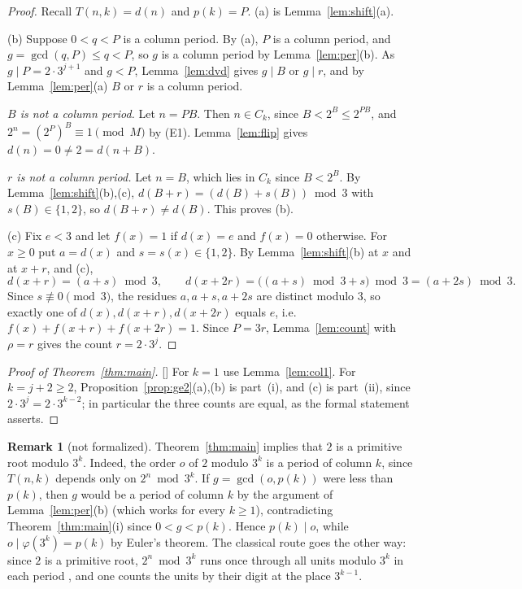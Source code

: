 \documentclass[11pt]{amsart}
\theoremstyle{plain}
\theoremstyle{definition}
\newtheorem{remark}[theorem]{Remark}
\begin{document}
\begin{proof}
Recall $T(n,k)=d(n)$ and $p(k)=P$.
(a) is Lemma~\ref{lem:shift}(a).

(b) Suppose $0<q<P$ is a column period. By (a), $P$ is a column period, and $g=\gcd(q,P)\le q<P$, so $g$ is a column period by Lemma~\ref{lem:per}(b). As $g\mid P=2\cdot3^{j+1}$ and $g<P$, Lemma~\ref{lem:dvd} gives $g\mid B$ or $g\mid r$, and by Lemma~\ref{lem:per}(a) $B$ or $r$ is a column period.

\emph{$B$ is not a column period.} Let $n=PB$. Then $n\in C_k$, since $B<2^B\le2^{PB}$, and $2^{n}=(2^{P})^{B}\equiv1\pmod M$ by (E1). Lemma~\ref{lem:flip} gives $d(n)=0\ne2=d(n+B)$.

\emph{$r$ is not a column period.} Let $n=B$, which lies in $C_k$ since $B<2^B$. By Lemma~\ref{lem:shift}(b),(c), $d(B+r)=(d(B)+s(B))\bmod3$ with $s(B)\in\{1,2\}$, so $d(B+r)\ne d(B)$. This proves (b).

(c) Fix $e<3$ and let $f(x)=1$ if $d(x)=e$ and $f(x)=0$ otherwise. For $x\ge0$ put $a=d(x)$ and $s=s(x)\in\{1,2\}$. By Lemma~\ref{lem:shift}(b) at $x$ and at $x+r$, and (c),
\[
  d(x+r)=(a+s)\bmod3,\qquad d(x+2r)=\bigl((a+s)\bmod3+s\bigr)\bmod3=(a+2s)\bmod 3 .
\]
Since $s\not\equiv0\pmod3$, the residues $a,a+s,a+2s$ are distinct modulo $3$, so exactly one of $d(x),d(x+r),d(x+2r)$ equals $e$, i.e.\ $f(x)+f(x+r)+f(x+2r)=1$. Since $P=3r$, Lemma~\ref{lem:count} with $\rho=r$ gives the count $r=2\cdot3^j$.
\end{proof}

\begin{proof}[Proof of Theorem~\ref{thm:main}]
[] For $k=1$ use Lemma~\ref{lem:col1}. For $k=j+2\ge2$, Proposition~\ref{prop:ge2}(a),(b) is part~(i), and (c) is part~(ii), since $2\cdot3^j=2\cdot3^{k-2}$; in particular the three counts are equal, as the formal statement asserts.
\end{proof}

\begin{remark}[not formalized]\label{rem:primroot}
Theorem~\ref{thm:main} implies that $2$ is a primitive root modulo $3^k$. Indeed, the order $o$ of $2$ modulo $3^k$ is a period of column $k$, since $T(n,k)$ depends only on $2^n\bmod3^k$. If $g=\gcd(o,p(k))$ were less than $p(k)$, then $g$ would be a period of column $k$ by the argument of Lemma~\ref{lem:per}(b) (which works for every $k\ge1$), contradicting Theorem~\ref{thm:main}(i) since $0<g<p(k)$. Hence $p(k)\mid o$, while $o\mid\varphi(3^k)=p(k)$ by Euler's theorem. The classical route goes the other way: since $2$ is a primitive root, $2^n\bmod3^k$ runs once through all units modulo $3^k$ in each period \cite{dFT,Lag}, and one counts the units by their digit at the place $3^{k-1}$.
\end{remark}
\end{document}
